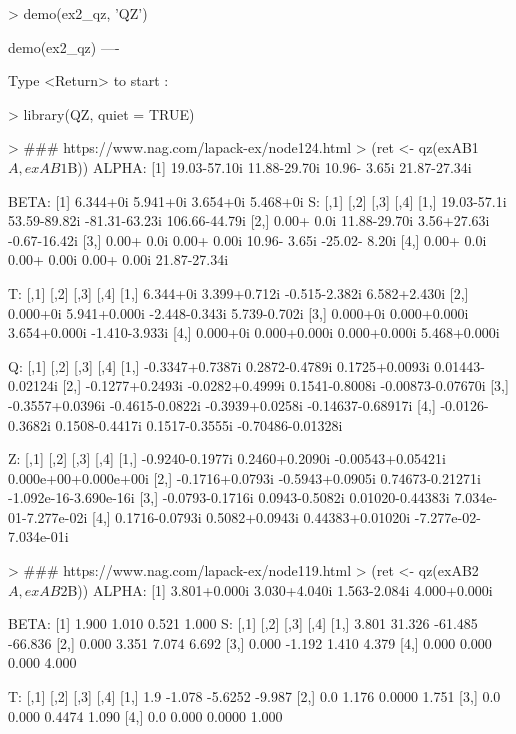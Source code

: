 \begin{Code}[title=QZ demo ex2\_qz]
> demo(ex2_qz, 'QZ')


	demo(ex2_qz)
	---- ~~~~~~

Type  <Return>	 to start : 

> library(QZ, quiet = TRUE)

> ### https://www.nag.com/lapack-ex/node124.html
> (ret <- qz(exAB1$A, exAB1$B))
ALPHA:
[1] 19.03-57.10i 11.88-29.70i 10.96- 3.65i 21.87-27.34i

BETA:
[1] 6.344+0i 5.941+0i 3.654+0i 5.468+0i
S:
            [,1]         [,2]          [,3]          [,4]
[1,] 19.03-57.1i 53.59-89.82i -81.31-63.23i 106.66-44.79i
[2,]  0.00+ 0.0i 11.88-29.70i   3.56+27.63i  -0.67-16.42i
[3,]  0.00+ 0.0i  0.00+ 0.00i  10.96- 3.65i -25.02- 8.20i
[4,]  0.00+ 0.0i  0.00+ 0.00i   0.00+ 0.00i  21.87-27.34i

T:
         [,1]         [,2]          [,3]          [,4]
[1,] 6.344+0i 3.399+0.712i -0.515-2.382i  6.582+2.430i
[2,] 0.000+0i 5.941+0.000i -2.448-0.343i  5.739-0.702i
[3,] 0.000+0i 0.000+0.000i  3.654+0.000i -1.410-3.933i
[4,] 0.000+0i 0.000+0.000i  0.000+0.000i  5.468+0.000i

Q:
                [,1]            [,2]            [,3]              [,4]
[1,] -0.3347+0.7387i  0.2872-0.4789i  0.1725+0.0093i  0.01443-0.02124i
[2,] -0.1277+0.2493i -0.0282+0.4999i  0.1541-0.8008i -0.00873-0.07670i
[3,] -0.3557+0.0396i -0.4615-0.0822i -0.3939+0.0258i -0.14637-0.68917i
[4,] -0.0126-0.3682i  0.1508-0.4417i  0.1517-0.3555i -0.70486-0.01328i

Z:
                [,1]            [,2]              [,3]                  [,4]
[1,] -0.9240-0.1977i  0.2460+0.2090i -0.00543+0.05421i  0.000e+00+0.000e+00i
[2,] -0.1716+0.0793i -0.5943+0.0905i  0.74673-0.21271i -1.092e-16-3.690e-16i
[3,] -0.0793-0.1716i  0.0943-0.5082i  0.01020-0.44383i  7.034e-01-7.277e-02i
[4,]  0.1716-0.0793i  0.5082+0.0943i  0.44383+0.01020i -7.277e-02-7.034e-01i

> ### https://www.nag.com/lapack-ex/node119.html
> (ret <- qz(exAB2$A, exAB2$B))
ALPHA:
[1] 3.801+0.000i 3.030+4.040i 1.563-2.084i 4.000+0.000i

BETA:
[1] 1.900 1.010 0.521 1.000
S:
      [,1]   [,2]    [,3]    [,4]
[1,] 3.801 31.326 -61.485 -66.836
[2,] 0.000  3.351   7.074   6.692
[3,] 0.000 -1.192   1.410   4.379
[4,] 0.000  0.000   0.000   4.000

T:
     [,1]   [,2]    [,3]   [,4]
[1,]  1.9 -1.078 -5.6252 -9.987
[2,]  0.0  1.176  0.0000  1.751
[3,]  0.0  0.000  0.4474  1.090
[4,]  0.0  0.000  0.0000  1.000


\end{Code}
